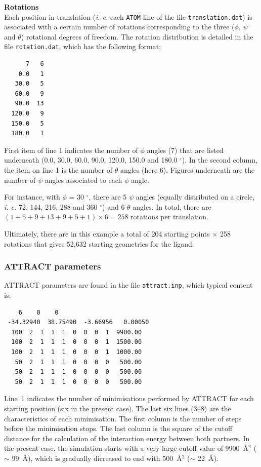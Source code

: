 \documentclass[12pt,a4paper]{article}
\begin{document}
\textbf{Rotations}\\
Each position in translation (\textit{i. e.} each {\tt ATOM} line of the file {\tt translation.dat})
is associated with a certain number of rotations corresponding to the three ($\phi$, $\psi$ and $\theta$) 
rotational degrees of freedom. The rotation distribution is detailed in the file {\tt rotation.dat},
which has the following format:

\linenumbers*
\begin{verbatim}
      7   6
    0.0   1
   30.0   5
   60.0   9
   90.0  13
  120.0   9
  150.0   5
  180.0   1
\end{verbatim}
\nolinenumbers

First item of line 1 indicates the number of $\phi$ angles (7) that are listed underneath 
(0.0, 30.0, 60.0, 90.0, 120.0, 150.0 and 180.0 $^\circ$). In the second column, the item on line 1 is the number of $\theta$ angles (here 6). Figures underneath are the number of $\psi$ angles associated to each $\phi$ angle.

For instance, with $\phi$ = 30 $^\circ$, there are 5 $\psi$ angles (equally distributed on a circle, \textit{i. e.} 72, 144, 216, 288 and 360 $^\circ$) and 6 $\theta$ angles.
In total, there are $ (1 + 5 + 9 + 13 + 9 + 5 + 1) \times 6 = 258$ rotations per translation.

\bigskip
Ultimately, there are in this example a total of 204 starting points $\times$ 258 rotations 
that gives 52,632 starting geometries for the ligand.


\subsubsection{ATTRACT parameters}

ATTRACT parameters are found in the file {\tt attract.inp}, which typical content is:

\linenumbers*
\begin{verbatim}
    6    0    0
 -34.32940  38.75490  -3.66956   0.00050
  100  2  1  1  1  0  0  0  1  9900.00
  100  2  1  1  1  0  0  0  1  1500.00
  100  2  1  1  1  0  0  0  1  1000.00
   50  2  1  1  1  0  0  0  0   500.00
   50  2  1  1  1  0  0  0  0   500.00
   50  2  1  1  1  0  0  0  0   500.00
\end{verbatim}
\nolinenumbers

Line~1 indicates the number of minimisations performed by ATTRACT
for each starting position (six in the present case). The last six lines (3--8) 
are the characteristics of
each minimisation. The first column is the number of steps before the
minimisation stops.  The last column is the square of the cutoff distance
for the calculation of the interaction energy between both partners. 
In the present case, the simulation starts with a very large cutoff value of 9900~\AA$^2$ 
($\sim$ 99~\AA), which is gradually dicreased
to end with 500~\AA$^2$ ($\sim$ 22~\AA).
\end{document}
